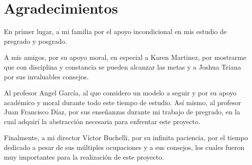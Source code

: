 \section*{Agradecimientos}

En primer lugar, a mi familia por el apoyo incondicional en mis estudio de pregrado y posgrado.

A mis amigos, por su apoyo moral, en especial a Karen Martinez, por mostrarme que con disciplina y constancia se pueden alcanzar las metas y a Joshua Triana por sus invaluables consejos.

Al profesor Angel García, al que considero un modelo a seguir y por su apoyo académico y moral durante todo este tiempo de estudio. Así mismo, al profesor Juan Francisco Díaz, por sus enseñanzas durante mi trabajo de pregrado, en la cual adquirí la abstracción necesaria para enfrentar este proyecto.

Finalmente, a mi director Víctor Buchelli, por su infinita paciencia, por el tiempo dedicado a pesar de sus múltiples ocupaciones y a sus consejos, los cuales fueron muy importantes para la realización de este proyecto.